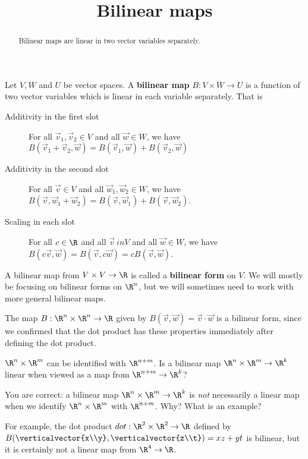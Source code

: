 \documentclass{ximera}
\title{Bilinear maps}
\begin{document}
\begin{abstract}
  Bilinear maps are linear in two vector variables separately.
\end{abstract}	

\begin{definition}
  Let $V,W$ and $U$ be vector spaces.  A \textbf{bilinear map} $B: V \times W \to U$ is a function of two vector variables which is linear in each variable separately. 
  That is
  \begin{description}
  \item[Additivity in the first slot] For all $\vec{v}_1,\vec{v}_2 \in V$ and 
    all $\vec{w} \in W$, we have $B(\vec{v}_1+\vec{v}_2,\vec{w}) = B(\vec{v}_1,\vec{w})+B(\vec{v}_2,\vec{w})$
    
  \item[Additivity in the second slot] For all $\vec{v} \in V$ and all
    $\vec{w}_1,\vec{w}_2 \in W$, we have $B(\vec{v},\vec{w}_1+\vec{w}_2) = B(\vec{v},\vec{w}_1)+B(\vec{v},\vec{w}_2)$.
    
  \item[Scaling in each slot] For all $c \in \R$ and all $\vec{v} \ in V$ and all
    $\vec{w} \in W$, we have $B(c\vec{v},\vec{w}) = B(\vec{v},c\vec{w}) = cB(\vec{v},\vec{w})$.
  \end{description}
\end{definition}
	
A bilinear map from $V \times V \to \R$ is called a \textbf{bilinear
  form} on $V$.  We will mostly be focusing on bilinear forms on
$\R^n$, but we will sometimes need to work with more general bilinear
maps.

\begin{example}	
The map $B:\R^n \times \R^n \to \R$ given by $B(\vec{v},\vec{w}) = \vec{v} \cdot \vec{w}$ is a bilinear form, since we confirmed that
the dot product has these properties immediately after defining the dot product.
\end{example}

\begin{question}
  $\R^n \times \R^m$ can be identified with $\R^{n+m}$.  Is a bilinear
  map $\R^n \times \R^m \to \R^k$ linear when viewed as a map from
  $\R^{n+m} \to \R^k$?  

  \begin{solution}
    \begin{multiple-choice}
    \end{multiple-choice}
  \end{solution}

  You are correct: a bilinear map $\R^n \times \R^m \to \R^k$ is
  \textit{not} necessarily a linear map when we identify $\R^n \times
  \R^m$ with $\R^{n+m}$.  Why?  What is an example?
  \begin{free-response}
    For example, the dot product $dot:\R^2 \times \R^2 \to \R$ defined
    by $B(\verticalvector{x\\y},\verticalvector{z\\t})=xz+yt$ is
    bilinear, but it is certainly not a linear map from $\R^4 \to \R$.
  \end{free-response}
\end{question}
\end{document}
